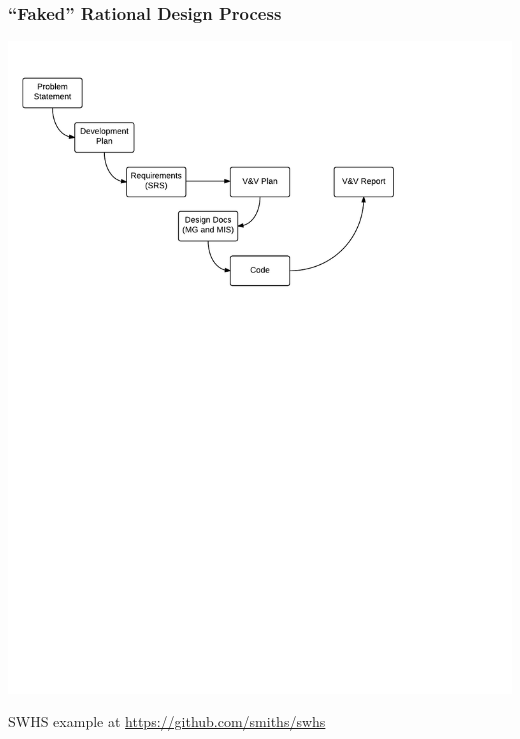 \documentclass{beamer}
\begin{document}

\begin{frame}

\frametitle{``Faked'' Rational Design Process}

\begin{center}
\includegraphics[scale=0.6]{OverviewOfProcess.pdf}
\end{center}

SWHS example at
\href{https://github.com/smiths/swhs}{https://github.com/smiths/swhs}

\end{frame}

\end{document}
